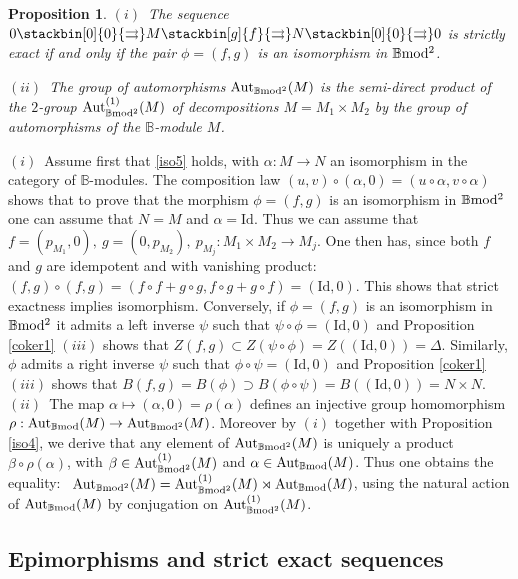 \documentclass[12pt]{article}
\newtheorem{prop}[thm]{Proposition}
\def\Aut{{\rm Aut}}
\def\id{{\rm id}}
\def\B{{\mathbb B}}
\def\strg{strict }
\def\strgly{strictly }
\def\id{{\mbox{Id}}}
\def\bmod{{\rm \B mod}}
\def\bm2{{\rm \B mod^2}}
\begin{document}
  \begin{prop}\label{iso9}  $(i)$~The sequence $0 \stackbin[0]{0}{\rightrightarrows}M\stackbin[g]{f}{\rightrightarrows}N\stackbin[0]{0}{\rightrightarrows}0$ is  \strgly exact if and only if the pair $\phi=(f,g)$ is an isomorphism in $\bm2$.
 
 $(ii)$~The group of automorphisms $\Aut_\bm2(M)$ is  the semi-direct product of the $2$-group $\Aut^{(1)}_\bm2(M)$ of decompositions $M=M_1\times M_2$ by the group of automorphisms of the $\B$-module $M$.
 \end{prop}
 \proof $(i)$~Assume first that \eqref{iso5} holds, with $\alpha:M\to N$ an isomorphism in the category of $\B$-modules. The composition law $(u,v)\circ(\alpha,0)=(u\circ \alpha,v\circ \alpha)$ 
shows that to prove that the morphism $\phi=(f,g)$ is an isomorphism in $\bm2$ one can assume that $N=M$ and $\alpha=\id$. Thus we can assume that 
$
f=(p_{M_1},0),~ g=(0,p_{M_2}),~ p_{M_j}:M_1\times M_2\to M_j
$. 
One then has, since both $f$ and $g$ are idempotent and with vanishing product:~ 
$
(f,g)\circ (f,g)=(f\circ f+g\circ g,f\circ g +g\circ f)=(\id,0).
$
This shows that \strg exactness implies isomorphism. \newline
Conversely, if $\phi=(f,g)$ is an isomorphism in $\bm2$ it admits a left inverse $\psi$ such that $\psi\circ \phi=(\id,0)$ and Proposition \ref{coker1} $(iii)$ shows that $Z(f,g)\subset Z(\psi\circ \phi)=Z((\id,0))=\Delta$. Similarly, $\phi$ admits a right inverse $\psi$ such that $\phi\circ \psi=(\id,0)$ and Proposition \ref{coker1} $(iii)$ shows that $B(f,g)=B(\phi)\supset B(\phi\circ \psi)=B((\id,0))=N\times N$.\newline
$(ii)$~The map $\alpha\mapsto (\alpha,0)=\rho(\alpha)$ defines an injective group homomorphism $\rho:\Aut_\bmod(M)\to \Aut_\bm2(M)$. Moreover by $(i)$ together with  Proposition \ref{iso4}, we derive that any element of $\Aut_\bm2(M)$ is uniquely a product $\beta\circ \rho(\alpha)$, with $\beta\in  \Aut^{(1)}_\bm2(M)$ and $\alpha \in \Aut_\bmod(M)$. Thus one obtains the equality:~ 
$
\Aut_\bm2(M)=\Aut^{(1)}_\bm2(M)\rtimes \Aut_\bmod(M)
$, 
using the natural action of $\Aut_\bmod(M)$ by conjugation on $\Aut^{(1)}_\bm2(M)$. \endproof

\subsection{Epimorphisms and  \strg exact sequences}\label{sectepistrong}
 
\end{document}
